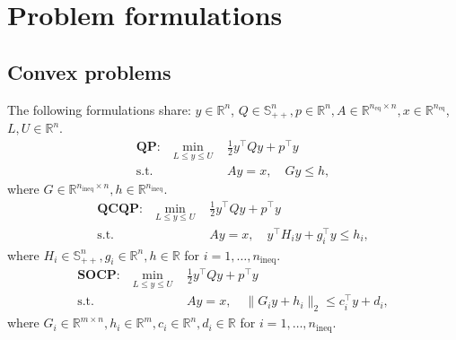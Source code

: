\documentclass{article}
\def\R{\mathbb{R}}
\def\st{\text{s.t.}}
\begin{document}


\clearpage

\section{Problem formulations} \label{appendix: problem formulations}
\subsection{Convex problems}
The following formulations share: $y \in \R^n$, $Q \in \mathbb{S}^n_{++}, p \in \R^n, A \in \R^{n_\text{eq} \times n}, x \in \R^{n_\text{eq}}$, $L, U \in \R^n$.
\begin{align*}
    \textbf{QP:} \quad \min_{L \leq y \leq U}\,\, & \frac{1}{2} y^\top Q y + p^\top y \\
    \st\,\, & Ay = x, \quad Gy \leq h,
\end{align*}
where $G \in \R^{n_\text{ineq} \times n}, h \in \R^{n_\text{ineq}}$.
\begin{align*}
    \textbf{QCQP:} \quad \min_{L \leq y \leq U}\,\, & \frac{1}{2} y^\top Q y + p^\top y \\
    \st\,\, & Ay = x, \quad y^\top H_i y + g_i^\top y \leq h_i,
\end{align*}
where 
$H_i \in \mathbb{S}^n_{++}, g_i \in \R^n, h \in \R$ for $i=1, \dots, n_\text{ineq}$.
\begin{align*}
    \textbf{SOCP:} \quad \min_{L \leq y \leq U}\,\, & \frac{1}{2} y^\top Q y + p^\top y \\
    \st\,\, & Ay = x, \quad \| G_i y + h_i \|_2 \leq c_i^\top y + d_i,
\end{align*}
where $G_i \in \R^{m\times n}, h_i \in \R^m, c_i \in \R^n, d_i \in \R$ for $i=1, \dots, n_\text{ineq}$.
\end{document}
